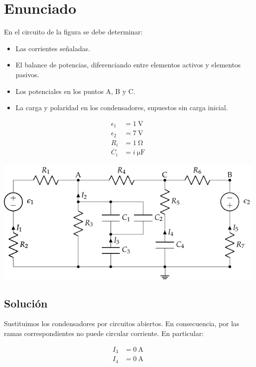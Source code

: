 \section{Enunciado}
En el circuito de la figura se debe determinar:
\begin{itemize}
\item Las corrientes señaladas.
\item El balance de potencias, diferenciando entre elementos activos y
  elementos pasivos.
\item Los potenciales en los puntos A, B y C.
\item La carga y polaridad en los condensadores, supuestos sin carga
  inicial.
\end{itemize}
\begin{minipage}[c]{0.3\linewidth}
  \begin{align*}
    \epsilon_1&=\qty{1}{\volt}\\
    \epsilon_2&=\qty{7}{\volt}\\
    R_i &= \qty{1}{\ohm}\\
    C_i &= \qty[parse-numbers=false]{i}{\micro\farad}
  \end{align*}
\end{minipage}
\begin{minipage}[c]{0.7\linewidth}
  \includegraphics{figuras/mallas_agrupacion_condensadores.pdf}
\end{minipage}

\subsection*{Solución}
Sustituimos los condensadores por circuitos abiertos. En consecuencia, por las ramas correspondientes no puede circular corriente. En particular:

\begin{align*}
  I_3 &= \qty{0}{\ampere}\\
  I_4 &= \qty{0}{\ampere}
\end{align*}

